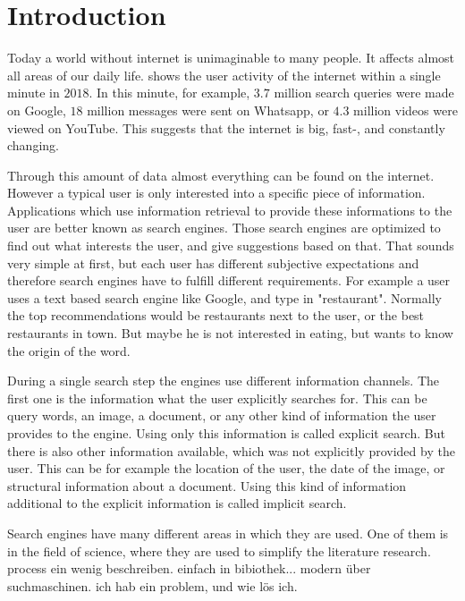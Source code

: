 \chapter{Introduction}
\label{cha:introduction}

Today a world without internet is unimaginable to many people. It affects almost all areas of our daily life.  shows the user activity of the internet within a single minute in $2018$. In this minute, for example, $3.7$ million search queries were made on Google, $18$ million messages were sent on Whatsapp, or $4.3$ million videos were viewed on YouTube. This suggests that the internet is big, fast-, and constantly changing.

Through this amount of data almost everything can be found on the internet. However a typical user is only interested into a specific piece of information. Applications which use information retrieval to provide these informations to the user are better known as search engines. Those search engines are optimized to find out what interests the user, and give suggestions based on that. That sounds very simple at first, but each user has different subjective expectations and therefore search engines have to fulfill different requirements. For example a user uses a text based search engine like Google, and type in "restaurant". Normally the top recommendations would be restaurants next to the user, or the best restaurants in town. But maybe he is not interested in eating, but wants to know the origin of the word. %

During a single search step the engines use different information channels. The first one is the information what the user explicitly searches for. This can be query words, an image, a document, or any other kind of information the user provides to the engine. Using only this information is called explicit search. But there is also other information available, which was not explicitly provided by the user. This can be for example the location of the user, the date of the image, or structural information about a document. Using this kind of information additional to the explicit information is called implicit search. %

Search engines have many different areas in which they are used. One of them is in the field of science, where they are used to simplify the literature research. process ein wenig beschreiben. einfach in bibiothek... modern über suchmaschinen. ich hab ein problem, und wie lös ich.


